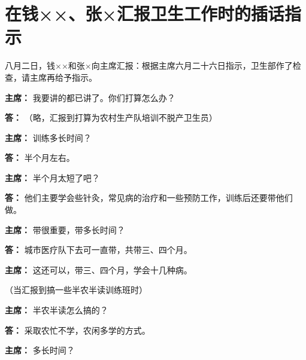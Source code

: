\section[在钱××、张×汇报卫生工作时的插话指示（一九六五年八月二日）]{在钱××、张×汇报卫生工作时的插话指示}


八月二日，钱××和张×向主席汇报：根据主席六月二十六日指示，卫生部作了检查，请主席再给予指示。

\begin{list}{}{
    \setlength{\topsep}{0pt}        %
    \setlength{\partopsep}{0pt}     %
    \setlength{\parsep}{\parskip}   %
    \setlength{\itemsep}{\lineskip}       %
    \setlength{\labelsep}{0pt}%
    \setlength{\labelwidth}{3em}%
    \setlength{\itemindent}{0pt}%
    \setlength\listparindent{\parindent}
    \setlength{\leftmargin}{3em}
    \setlength{\rightmargin}{0pt}
    }

\item[\textbf{主席：}] 我要讲的都已讲了。你们打算怎么办？

\item[\textbf{答：}] （略，汇报到打算为农村生产队培训不脱产卫生员）

\item[\textbf{主席：}] 训练多长时间？

\item[\textbf{答：}] 半个月左右。

\item[\textbf{主席：}] 半个月太短了吧？

\item[\textbf{答：}] 他们主要学会些针灸，常见病的治疗和一些预防工作，训练后还要带他们做。

\item[\textbf{主席：}] 带很重要，带多长时间？

\item[\textbf{答：}] 城市医疗队下去可一直带，共带三、四个月。

\item[\textbf{主席：}] 这还可以，带三、四个月，学会十几种病。

（当汇报到搞一些半农半读训练班时）

\item[\textbf{主席：}] 半农半读怎么搞的？

\item[\textbf{答：}] 采取农忙不学，农闲多学的方式。

\item[\textbf{主席：}] 多长时间？


\end{list}
